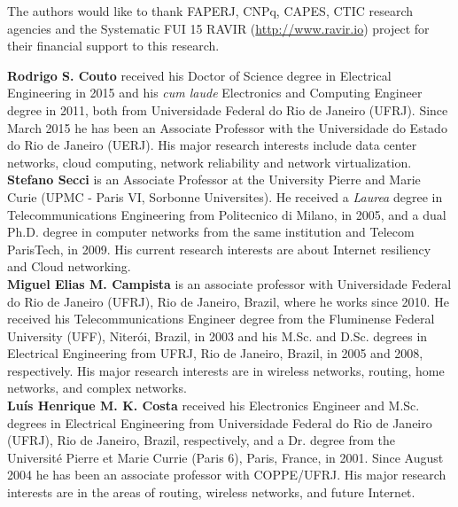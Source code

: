 \begin{acknowledgements}
The authors would like to thank FAPERJ, CNPq, CAPES, CTIC research agencies and the Systematic FUI 15 RAVIR (\url{http://www.ravir.io}) project for their financial support to this research.
\end{acknowledgements}






\noindent
\textbf{Rodrigo S. Couto} received his Doctor of Science degree in Electrical Engineering in 2015 and his \textit{cum laude} Electronics and Computing Engineer degree in 2011, both from Universidade Federal do Rio de Janeiro (UFRJ). Since March 2015 he has been an Associate Professor with the Universidade do Estado do Rio de Janeiro (UERJ). His major research interests include data center networks, cloud computing, network reliability and network virtualization.\\ 

\noindent
\textbf{Stefano Secci} is an Associate Professor at the University Pierre and Marie Curie (UPMC - Paris VI, Sorbonne Universites). He received a  \textit{Laurea} degree in Telecommunications Engineering from Politecnico di Milano, in 2005, and a dual Ph.D. degree in computer networks from the same institution and Telecom ParisTech, in 2009. His current research interests are about Internet resiliency and Cloud networking.\\

\noindent
\textbf{Miguel Elias M. Campista} is an associate professor with Universidade Federal do Rio de Janeiro (UFRJ), Rio de Janeiro, Brazil, where he works since 2010. He received his Telecommunications Engineer degree from the Fluminense Federal University (UFF), Niter{\'o}i, Brazil, in 2003 and his M.Sc. and D.Sc. degrees in Electrical Engineering from UFRJ, Rio de Janeiro, Brazil, in 2005 and 2008, respectively. His major research interests are in wireless networks, routing, home networks, and complex networks.\\

\noindent
\textbf{Lu\'is Henrique M. K. Costa} received his Electronics Engineer and M.Sc. degrees in Electrical Engineering from Universidade Federal do Rio de Janeiro (UFRJ), Rio de Janeiro, Brazil, respectively, and a Dr. degree from the Universit\'e Pierre et Marie Currie (Paris 6), Paris, France, in 2001. Since August 2004 he has been an associate professor with COPPE/UFRJ. His major research interests are in the areas of routing, wireless networks, and future Internet. 



